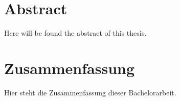 \section*{Abstract}

Here will be found the abstract of this thesis.

\pagebreak

\section*{Zusammenfassung}

Hier steht die Zusammenfassung dieser Bachelorarbeit.
